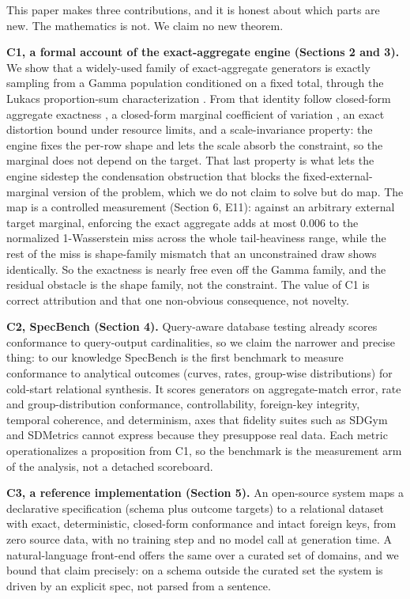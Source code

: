 This paper makes three contributions, and it is honest about which parts
are new. The mathematics is not. We claim no new theorem.

\textbf{C1, a formal account of the exact-aggregate engine (Sections 2
and 3).} We show that a widely-used family of exact-aggregate generators
is exactly sampling from a Gamma population conditioned on a fixed
total, through the Lukacs proportion-sum characterization
\cite{lukacs1955gamma}. From that identity follow closed-form aggregate
exactness \cite{cox1987rounding}, a closed-form marginal coefficient of
variation \cite{aitchison1986compositional}, an exact distortion bound
under resource limits, and a scale-invariance property: the engine fixes
the per-row shape and lets the scale absorb the constraint, so the
marginal does not depend on the target. That last property is what lets
the engine sidestep the condensation obstruction
\cite{armendariz2011condensation,szavits2014condensation} that blocks
the fixed-external-marginal version of the problem, which we do not
claim to solve but do map. The map is a controlled measurement (Section
6, E11): against an arbitrary external target marginal, enforcing the
exact aggregate adds at most 0.006 to the normalized 1-Wasserstein miss
across the whole tail-heaviness range, while the rest of the miss is
shape-family mismatch that an unconstrained draw shows identically. So
the exactness is nearly free even off the Gamma family, and the residual
obstacle is the shape family, not the constraint. The value of C1 is
correct attribution and that one non-obvious consequence, not novelty.

\textbf{C2, SpecBench (Section 4).} Query-aware database testing already
scores conformance to query-output cardinalities, so we claim the
narrower and precise thing: to our knowledge SpecBench is the first
benchmark to measure conformance to analytical outcomes (curves, rates,
group-wise distributions) for cold-start relational synthesis. It scores
generators on aggregate-match error, rate and group-distribution
conformance, controllability, foreign-key integrity, temporal coherence,
and determinism, axes that fidelity suites such as SDGym and SDMetrics
cannot express because they presuppose real data. Each metric
operationalizes a proposition from C1, so the benchmark is the
measurement arm of the analysis, not a detached scoreboard.

\textbf{C3, a reference implementation (Section 5).} An open-source
system maps a declarative specification (schema plus outcome targets) to
a relational dataset with exact, deterministic, closed-form conformance
and intact foreign keys, from zero source data, with no training step
and no model call at generation time. A natural-language front-end
offers the same over a curated set of domains, and we bound that claim
precisely: on a schema outside the curated set the system is driven by
an explicit spec, not parsed from a sentence.

